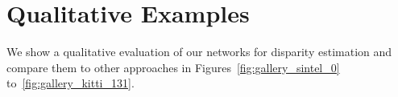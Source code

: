 \documentclass[10pt,twocolumn,letterpaper]{article}
\begin{document}
\section{Qualitative Examples}\label{sec:qual}
We show a qualitative evaluation of our networks for disparity estimation and compare them to other approaches in Figures~\ref{fig:gallery_sintel_0} to~\ref{fig:gallery_kitti_131}.

\newcommand{\galleryfigure}[2]{
\begin{figure*}[h]
  \begin{center}%
  \resizebox{0.99\linewidth}{!}{%
    \setlength{\tabcolsep}{1pt}%
    \begin{tabular}{ccccc}%
      RGB image (L) &
      RGB image (R) &
      DispNet &
      DispNet-K &
      MC-CNN-fst \\
      \texttt{[image: gallery/\#1\_imgL.jpg]} &
      \texttt{[image: gallery/\#1\_imgR.jpg]} &
      \texttt{[image: gallery/\#1\_A.jpg]} &
      \texttt{[image: gallery/\#1\_C.jpg]} &
      \texttt{[image: gallery/\#1\_E.jpg]} \\

      \multicolumn{2}{l}{\texttt{[image: gallery/\#1\_gt.jpg]}} &
      \texttt{[image: gallery/\#1\_B.jpg]} &
      \texttt{[image: gallery/\#1\_D.jpg]} &
      \texttt{[image: gallery/\#1\_F.jpg]} \\
      ground truth (sparse)&
      &
      DispNetCorr1D &
      DispNetCorr1D-K &
      SGM \\
    \end{tabular}%
  }%
  \end{center}%
  \caption{#2}%
  \label{fig:gallery_#1}%
\end{figure*}
}
\end{document}
